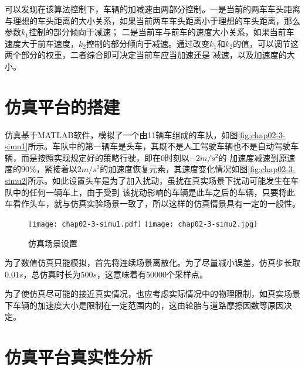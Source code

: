 可以发现在该算法控制下，车辆的加减速由两部分控制。一是当前的两车车头距离与理想的车头距离的大小关系，如果当前两车车头距离小于理想的车头距离，那么参数$k_1$控制的部分倾向于减速；
二是当前车与前车的速度大小关系，如果当前车速度大于前车速度，$k_2$控制的部分倾向于减速。通过改变$k_1$和$k_2$的值，可以调节这两个部分的权重，二者综合即可决定当前车应当加速还是
减速，以及加速度的大小。


\section{仿真平台的搭建}

仿真基于MATLAB软件，模拟了一个由11辆车组成的车队，如图\ref{fig:chap02-3-simu1}所示。车队中的第一辆车是头车，其既不是人工驾驶车辆也不是自动驾驶车辆，而是按照实现规定好的策略行驶，即在0时刻以$-2m/s^2$的
加速度减速到原速度的$90\%$，紧接着以$2m/s^2$的加速度恢复元素，其速度变化情况如图\ref{fig:chap02-3-simu2}所示。如此设置头车是为了加入扰动，虽扰在真实场景下扰动可能发生在车队中的任何一辆车上，由于受到
该扰动影响的车辆是此车之后的车辆，只要将此车看作头车，就与仿真实验场景一致了，所以这样的仿真情景具有一定的一般性。

\begin{figure}
  \centering
    {\texttt{[image: chap02-3-simu1.pdf]}}
    {\texttt{[image: chap02-3-simu2.jpg]}}
  \caption{仿真场景设置}
  \label{fig:chap02-2-simu}
\end{figure}

为了数值仿真只能模拟，首先将连续场景离散化。为了尽量减小误差，仿真步长取$0.01s$，总仿真时长为$500s$，这意味着有50000个采样点。

为了使仿真尽可能的接近真实情况，也应考虑实际情况中的物理限制，如真实场景下车辆的加速度大小是限制在一定范围内的，这由轮胎与道路摩擦因数等原因决定。


\section{仿真平台真实性分析}

